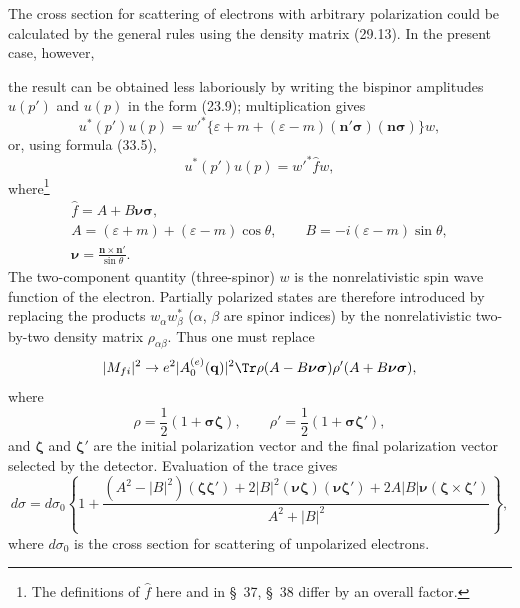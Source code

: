 The cross section for scattering of electrons with arbitrary polarization could be calculated by the general rules using the density matrix (29.13). In the present case, however,

the result can be obtained less laboriously by writing the bispinor amplitudes $u(p')$ and $u(p)$ in the form (23.9); multiplication gives
\[
u^*(p')u(p)=w'^*\{\varepsilon+m+(\varepsilon-m)
(\mathbf n'\boldsymbol\sigma)(\mathbf n\boldsymbol\sigma)\}w,
\]
or, using formula (33.5),
\begin{equation}
u^*(p')u(p)=w'^*\widehat f w,
\tag{80.11}
\end{equation}
where\footnote{The definitions of $\widehat f$ here and in \S~37, \S~38 differ by an overall factor.}
\begin{equation}
\begin{gathered}
\widehat f=A+B\boldsymbol\nu\boldsymbol\sigma,\\
A=(\varepsilon+m)+(\varepsilon-m)\cos\theta,
\qquad B=-i(\varepsilon-m)\sin\theta,\\
\boldsymbol\nu=\frac{\mathbf n\times\mathbf n'}{\sin\theta}.
\end{gathered}
\tag{80.12}
\end{equation}
The two-component quantity (three-spinor) $w$ is the nonrelativistic spin wave function of the electron. Partially polarized states are therefore introduced by replacing the products $w_\alpha w_\beta^*$ ($\alpha$, $\beta$ are spinor indices) by the nonrelativistic two-by-two density matrix $\rho_{\alpha\beta}$. Thus one must replace
\[
|M_{fi}|^2\to e^2|A_0^{(e)}(\mathbf q)|^2
\Tr\rho(A-B\boldsymbol\nu\boldsymbol\sigma)
\rho'(A+B\boldsymbol\nu\boldsymbol\sigma),
\]
where
\[
\rho=\frac{1}{2}(1+\boldsymbol\sigma\boldsymbol\zeta),
\qquad
\rho'=\frac{1}{2}(1+\boldsymbol\sigma\boldsymbol\zeta'),
\]
and $\boldsymbol\zeta$ and $\boldsymbol\zeta'$ are the initial polarization vector and the final polarization vector selected by the detector. Evaluation of the trace gives
\begin{equation}
d\sigma=d\sigma_0\left\{1+
\frac{(A^2-|B|^2)(\boldsymbol\zeta\boldsymbol\zeta')
+2|B|^2(\boldsymbol\nu\boldsymbol\zeta)(\boldsymbol\nu\boldsymbol\zeta')
+2A|B|\boldsymbol\nu(\boldsymbol\zeta\times\boldsymbol\zeta')}
{A^2+|B|^2}\right\},
\tag{80.13}
\end{equation}
where $d\sigma_0$ is the cross section for scattering of unpolarized electrons.

